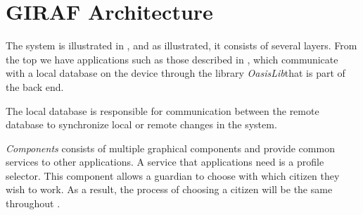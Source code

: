 \section{GIRAF Architecture}
\label{sec:giraf:architecture}
The \giraf system is illustrated in , and as illustrated, it consists of several layers. 
From the top we have applications such as those described in , which communicate with a local database on the device through the library \textit{OasisLib}that is part of the \giraf back end.

The local database is responsible for communication between the remote database to synchronize local or remote changes in the system.

\textit{\giraf Components} consists of multiple graphical components and provide common services to other \giraf applications.
A service that applications need is a profile selector.
This component allows a guardian to choose with which citizen they wish to work.
As a result, the process of choosing a citizen will be the same throughout \giraf.


